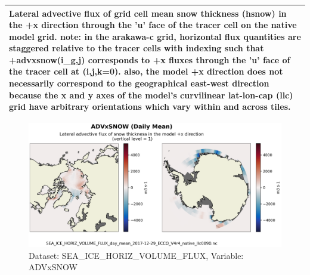 \begin{longtable}{|m{}|m{}|m{}|m{}|}
\multicolumn{4}{|p{1\textwidth}|}{\footnotesize{{Lateral advective flux of grid cell mean snow thickness (hsnow) in the +x direction through the 'u' face of the tracer cell on the native model grid. note: in the arakawa-c grid, horizontal flux quantities are staggered relative to the tracer cells with indexing such that +advxsnow(i\_g,j) corresponds to +x fluxes through the 'u' face of the tracer cell at (i,j,k=0). also, the model +x direction does not necessarily correspond to the geographical east-west direction because the x and y axes of the model's curvilinear lat-lon-cap (llc) grid have arbitrary orientations which vary within and across tiles.}}} \\ \hline
\end{longtable}

\begin{figure}[H]
\centering
\includegraphics[scale=0.55]{../images/plots/v4r4/native_plots/Sea-Ice_and_Snow_Horizontal_Volume_Fluxes/ADVxSNOW.png}
\caption{Dataset: SEA\_ICE\_HORIZ\_VOLUME\_FLUX, Variable: ADVxSNOW}
\label{tab:table-SEA_ICE_HORIZ_VOLUME_FLUX_ADVxSNOW-Plot}
\end{figure}
\newpage
\pagebreak
